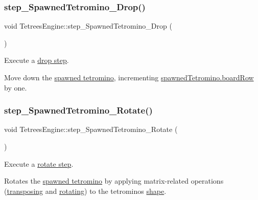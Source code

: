 \subsubsection{\texorpdfstring{step\+\_\+\+Spawned\+Tetromino\+\_\+\+Drop()}{step\_SpawnedTetromino\_Drop()}}
{\footnotesize\ttfamily void Tetrees\+Engine\+::step\+\_\+\+Spawned\+Tetromino\+\_\+\+Drop (\begin{DoxyParamCaption}{ }\end{DoxyParamCaption})\hspace{0.3cm}{\ttfamily [private]}}



Execute a \hyperlink{TetreesDefs_8hpp_a4d5a793092a473f85b4c1f7faf62afeda6df5f4c213c30a4ad91af7a5d10daa8e}{drop step}. 

Move down the \hyperlink{classTetreesEngine_a26435ee2f02d9ba70d9e359745114f6e}{spawned tetromino}, incrementing \hyperlink{structpiece__t}{spawned\+Tetromino.board\+Row} by one. \mbox{\label{classTetreesEngine_a90d1d65e12fb37850962305d8bc3b7a3}} 
\subsubsection{\texorpdfstring{step\+\_\+\+Spawned\+Tetromino\+\_\+\+Rotate()}{step\_SpawnedTetromino\_Rotate()}}
{\footnotesize\ttfamily void Tetrees\+Engine\+::step\+\_\+\+Spawned\+Tetromino\+\_\+\+Rotate (\begin{DoxyParamCaption}{ }\end{DoxyParamCaption})\hspace{0.3cm}{\ttfamily [private]}}



Execute a \hyperlink{TetreesDefs_8hpp_a4d5a793092a473f85b4c1f7faf62afeda22387bf41fe41a5ac2b7b74ab8f5c342}{rotate step}. 

Rotates the \hyperlink{classTetreesEngine_a26435ee2f02d9ba70d9e359745114f6e}{spawned tetromino} by applying matrix-\/related operations (\hyperlink{classMatrix2D_a788abe5e1fbd6a1fbd0d445aca4f8300}{transposing} and \hyperlink{classMatrix2D_a2845ff86d7f24ccd338b42b2a9cbe017}{rotating}) to the tetromino\textquotesingle{}s \hyperlink{structpiece__t_a3c8f9c2e51c6bab728e564143c439746}{shape}. \mbox{\label{classTetreesEngine_ab7169a28a06a867ada69a01a580fb2ad}} 
